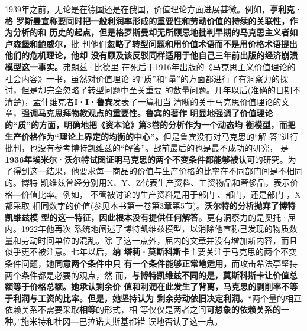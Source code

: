 1939年之前，无论是在德国还是在俄国，价值理论方面进展甚微。例如，\textbf{亨利克·格
  罗斯曼宣称要同时把一般利润率形成的重要性和劳动价值的持续的关联性，作为分析的和
  历史的起点，但是格罗斯曼却无所顾忌地批判早期的马克思主义者如卢森堡和鲍威尔，}批
判他们\textbf{忽略了转型问题和用价值术语而不是用价格术语提出他们的危机理论，他却
  没有顾及该反驳同样适用于他自己三年前出版的经济崩溃模型这一事实。}弗朗兹·比德里
在死后于1916年出版的《马克思主义价值理论的社会内容》一书，虽然对价值理论
的“质”和“量”的方面都进行了有洞察力的探讨，但是却完全忽略了转型问题中至关重要
的数量问题。几年以后(准确的日期不清楚)，孟什维克者\textbf{I·I·鲁宾}发表了一篇相当
清晰的关于马克思价值理论的文章，\textbf{强调马克思拜物教观点的重要性。鲁宾的著作
  明显地强调了价值理论的“质”的方面，明确地把《资本论》第3卷的分析作为一个动态均
  衡模型，而把生产价格作为“理论上界定的均衡的中心”。}但是鲁宾没有对马克思的“解
答”进行批判，也没有参考博特凯维兹的“解答”。战前最后的也是最不成功的研究，
是\textbf{1936年埃米尔·沃尔特试图证明马克思的两个不变条件都能够被认可}的研究。为
了得到这一结果，他要求每一商品的价值与生产价格的比率在不同部门间是不相同的。博特
凯维兹曾经分别用X、Y、Z代表生产资料、工资物品和奢侈品，表示价格—价值比率。例如，
不管被讨论的生产资料是用于部门 、部门，还是部门 ，X都采取
相同数字的价值(参见本书第一卷第3章第5节)。\textbf{沃尔特的分析抛弃了博特凯维兹模
  型的这一特征，因此根本没有提供任何解答。}更有洞察力的是奥托·屈内。1922年他再次
系统地阐述了博特凯维兹模型，以消除他宣称己发现的物质数量和劳动时间单位的混乱。除
了这一点外，屈内的文章并没有增加新内容，而且似乎更不被注意。七年以后，\textbf{纳
  塔莉·莫斯科斯卡}主要关注于马克思的两个不变条件问题，她\textbf{同意两个条件中只
  有一个条件能够正常地适用，}而攻击希法亭坚持两个条件都是必要的观点，然
而，\textbf{与博特凯维兹不同的是，莫斯科斯卡让价值总额等于价格总额。她承认剩余价
  值和利润在此发生了背离，马克思的剥削率不等于利润与工资的比率。但是，她坚持认为
  剩余劳动依旧决定利润。}“两个量的相互依赖关系不需要采取\textbf{相等}的形式，相
等仅仅是两者之间\textbf{可想象的依赖关系的一种}。”施米特和杜冈—巴拉诺夫斯基都错
误地否认了这一点。

